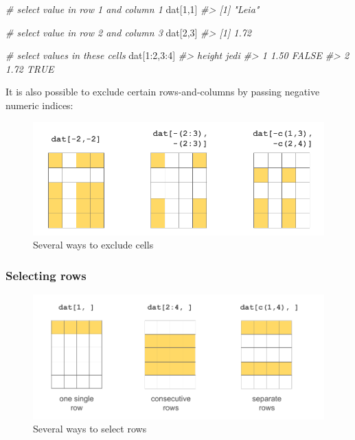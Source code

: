 \documentclass[
]{book}
\newenvironment{Shaded}{\begin{snugshade}}{\end{snugshade}}
\newcommand{\CommentTok}[1]{\textcolor[rgb]{0.56,0.35,0.01}{\textit{#1}}}
\newcommand{\DecValTok}[1]{\textcolor[rgb]{0.00,0.00,0.81}{#1}}
\newcommand{\NormalTok}[1]{#1}
\newcommand{\SpecialCharTok}[1]{\textcolor[rgb]{0.00,0.00,0.00}{#1}}
\begin{document}
\begin{Shaded}
\begin{Highlighting}[]
\CommentTok{\# select value in row 1 and column 1}
\NormalTok{dat[}\DecValTok{1}\NormalTok{,}\DecValTok{1}\NormalTok{]}
\CommentTok{\#\textgreater{} [1] "Leia"}

\CommentTok{\# select value in row 2 and column 3}
\NormalTok{dat[}\DecValTok{2}\NormalTok{,}\DecValTok{3}\NormalTok{]}
\CommentTok{\#\textgreater{} [1] 1.72}

\CommentTok{\# select values in these cells}
\NormalTok{dat[}\DecValTok{1}\SpecialCharTok{:}\DecValTok{2}\NormalTok{,}\DecValTok{3}\SpecialCharTok{:}\DecValTok{4}\NormalTok{]}
\CommentTok{\#\textgreater{}   height  jedi}
\CommentTok{\#\textgreater{} 1   1.50 FALSE}
\CommentTok{\#\textgreater{} 2   1.72  TRUE}
\end{Highlighting}
\end{Shaded}

It is also possible to exclude certain rows-and-columns by passing negative
numeric indices:

\begin{figure}

{\centering \includegraphics[width=0.8\linewidth]{images/objects/obj-dataframe-cells2} 

}

\caption{Several ways to exclude cells}\label{fig:unnamed-chunk-147}
\end{figure}

\hypertarget{selecting-rows}{%
\subsubsection*{Selecting rows}\label{selecting-rows}}

\begin{figure}

{\centering \includegraphics[width=0.8\linewidth]{images/objects/obj-dataframe-rows1} 

}

\caption{Several ways to select rows}\label{fig:unnamed-chunk-148}
\end{figure}
\end{document}
